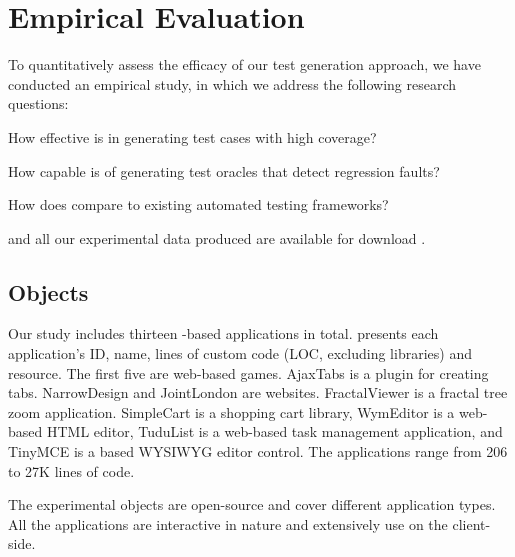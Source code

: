 \section{Empirical Evaluation} \label{Sec:evaluation}

To quantitatively assess the efficacy of our test generation approach, we have conducted an empirical study, in which we address the following research questions:



\begin{description}[noitemsep]
\item [RQ1] How effective is \tool in generating test cases with high coverage? 
\item [RQ2] How capable is \tool of generating test oracles that detect regression faults?
\item [RQ3] How does \tool compare to existing automated \javascript testing frameworks?
\end{description} 


\tool and all our experimental data produced are available for download \cite{jseft-dl}.



\subsection{Objects}
Our study includes thirteen \javascript-based applications in total. 
 presents each application's ID, name, lines of custom \javascript code (LOC, excluding \javascript libraries) and resource.
The first five are web-based games. AjaxTabs is a \jquery plugin for creating tabs. NarrowDesign and JointLondon are websites. FractalViewer is a fractal tree zoom application. SimpleCart is a  shopping cart library, WymEditor is a web-based HTML editor, Tudu\-List is a web-based task management application, and Tiny\-MCE is a \javascript based WYSIWYG editor control. The applications range from 206 to 27K lines of \javascript code.

The experimental objects are open-source and cover different application types. All the applications are interactive in nature and extensively use \javascript on the client-side. %


